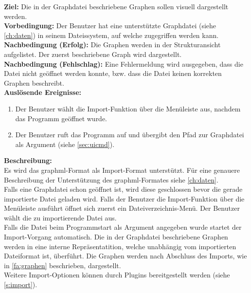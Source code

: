 \label{fa:import}
\textbf{Ziel:} Die in der Graphdatei beschriebene Graphen sollen visuell dargestellt werden.\\
\textbf{Vorbedingung:} Der Benutzer hat eine unterstützte Graphdatei (siehe \ref{ch:daten}) in seinem Dateissystem, auf welche zugegriffen werden kann.\\
\textbf{Nachbedingung (Erfolg):} Die Graphen werden in der Strukturansicht aufgelistet. Der zuerst beschriebene Graph wird dargestellt.\\
\textbf{Nachbedingung (Fehlschlag):}
Eine Fehlermeldung wird ausgegeben, dass die Datei nicht geöffnet werden konnte, bzw. dass die Datei keinen korrekten Graphen beschreibt.\\
\textbf{Auslösende Ereignisse:}
\begin{enumerate}[nolistsep, label=(\alph*)]
  \item Der Benutzer wählt die Import-Funktion über die Menüleiste aus, nachdem das Programm geöffnet wurde. %
  \item Der Benutzer ruft das Programm auf und übergibt den Pfad zur Graphdatei als Argument (siehe \ref{sec:uicmd}).
\end{enumerate}
\textbf{Beschreibung:}\\
Es wird das \gls{graphml}-Format als Import-Format unterstützt. Für eine genauere Beschreibung der Unterstützung des \gls{graphml}-Formates siehe \ref{ch:daten}.\\
Falls eine Graphdatei schon geöffnet ist, wird diese geschlossen bevor die gerade importierte Datei geladen wird.
Falls der Benutzer die Import-Funktion über die Menüleiste ausführt öffnet sich zuerst ein Dateiverzeichnis-Menü.
Der Benutzer wählt die zu importierende Datei aus.\\
Falls die Datei beim Programmstart als Argument angegeben wurde startet der Import-Vorgang automatisch.
Die in der Graphdatei beschriebene Graphen werden in eine interne Repräsentatition, welche unabhängig vom importierten Dateiformat ist, überführt.%
Die Graphen werden nach Abschluss des Imports, wie in \ref{fa:graphen} beschrieben, dargestellt.\\
Weitere Import-Optionen können durch Plugins bereitgestellt werden (siehe \ref{s:import}).

